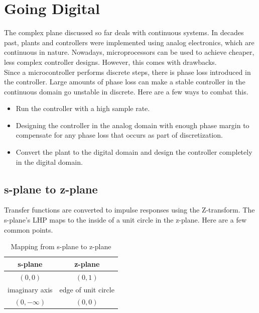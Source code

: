 \documentclass[10pt,conference,compsoc]{IEEEtran}
\begin{document}
\section{Going Digital}

\noindent The complex plane discussed so far deals with continuous systems. In
decades past, \glspl{plant} and controllers were implemented using analog electronics,
which are continuous in nature. Nowadays, microprocessors can be used to achieve
cheaper, less complex controller designs. However, this comes with drawbacks. \\

\noindent Since a microcontroller performs discrete steps, there is phase loss
introduced in the controller. Large amounts of phase loss can make a stable
controller in the continuous domain go unstable in discrete. Here are a few ways
to combat this.

\begin{itemize}
  \item Run the controller with a high sample rate.
  \item Designing the controller in the analog domain with enough phase margin to compensate for any phase loss that occurs as part of discretization.
  \item Convert the plant to the digital domain and design the controller
    completely in the digital domain.
\end{itemize}

\subsection{s-plane to z-plane}

\noindent Transfer functions are converted to impulse responses using the
Z-transform. The s-plane's LHP maps to the inside of a unit circle in the
z-plane. Here are a few common points.

\begin{table}[ht]
  \caption{Mapping from s-plane to z-plane}
  \renewcommand{\arraystretch}{1.3}
  \centering
  \begin{tabular}{|cc|}
    \hline
    \textbf{s-plane} & \textbf{z-plane} \\
    \hline
    $(0, 0)$ & $(0, 1)$ \\
    imaginary axis & edge of unit circle \\
    $(0, -\infty)$ & $(0, 0)$ \\
    \hline
  \end{tabular}
  \label{tab:s-plane2z-plane}
\end{table}
\end{document}
